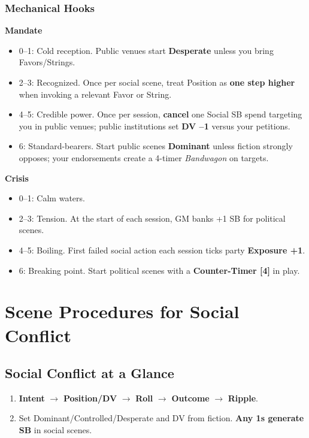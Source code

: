 \documentclass[11pt]{article}
\begin{document}
\subsubsection*{Mechanical Hooks}
\textbf{Mandate}
\begin{itemize}
  \item 0--1: Cold reception. Public venues start \textbf{Desperate} unless you bring Favors/Strings.
  \item 2--3: Recognized. Once per social scene, treat Position as \textbf{one step higher} when invoking a relevant Favor or String.
  \item 4--5: Credible power. Once per session, \textbf{cancel} one Social SB spend targeting you in public venues; public institutions set \textbf{DV --1} versus your petitions.
  \item 6: Standard-bearers. Start public scenes \textbf{Dominant} unless fiction strongly opposes; your endorsements create a 4-timer \emph{Bandwagon} on targets.
\end{itemize}
\textbf{Crisis}
\begin{itemize}
  \item 0--1: Calm waters.
  \item 2--3: Tension. At the start of each session, GM banks +1 SB for political scenes.
  \item 4--5: Boiling. First failed social action each session ticks party \textbf{Exposure +1}.
  \item 6: Breaking point. Start political scenes with a \textbf{Counter-Timer [4]} in play.
\end{itemize}

\section{Scene Procedures for Social Conflict}
\subsection*{Social Conflict at a Glance}
\begin{enumerate}
  \item \textbf{Intent} $\to$ \textbf{Position/DV} $\to$ \textbf{Roll} $\to$ \textbf{Outcome} $\to$ \textbf{Ripple}.
  \item Set Dominant/Controlled/Desperate and DV from fiction. \textbf{Any 1s generate SB} in social scenes.
\end{enumerate}
\end{document}
